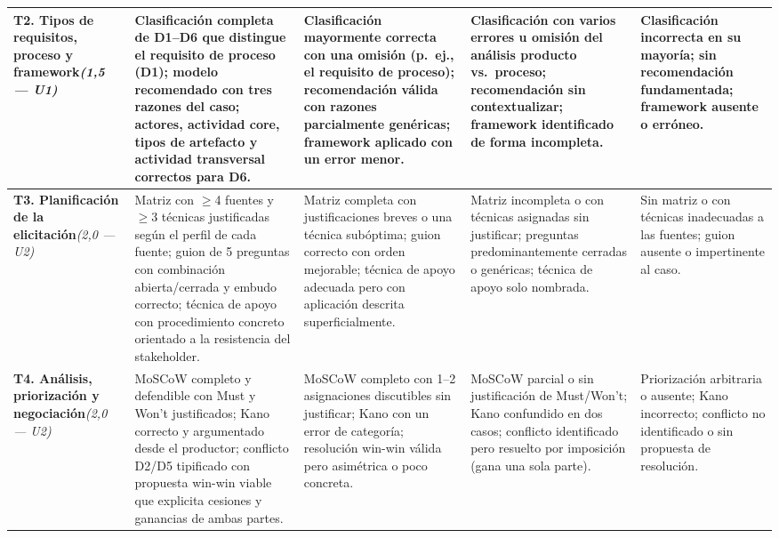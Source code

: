\documentclass[11pt]{article}
\begin{document}
\begin{landscape}
{\begin{longtable}{|L{3.2cm}|L{5.6cm}|L{5.3cm}|L{4.9cm}|L{4.3cm}|}
\textbf{T2. Tipos de requisitos, proceso y framework}\newline\textit{(1{,}5 — U1)} &
Clasificación completa de D1--D6 que distingue el requisito de \textbf{proceso} (D1); modelo recomendado con tres razones del caso; actores, actividad core, tipos de artefacto y actividad transversal correctos para D6. &
Clasificación mayormente correcta con una omisión (p.\ ej., el requisito de proceso); recomendación válida con razones parcialmente genéricas; framework aplicado con un error menor. &
Clasificación con varios errores u omisión del análisis producto vs.\ proceso; recomendación sin contextualizar; framework identificado de forma incompleta. &
Clasificación incorrecta en su mayoría; sin recomendación fundamentada; framework ausente o erróneo. \\
\hline

\textbf{T3. Planificación de la elicitación}\newline\textit{(2{,}0 — U2)} &
Matriz con $\geq$4 fuentes y $\geq$3 técnicas justificadas según el perfil de cada fuente; guion de 5 preguntas con combinación abierta/cerrada y embudo correcto; técnica de apoyo con procedimiento concreto orientado a la resistencia del stakeholder. &
Matriz completa con justificaciones breves o una técnica subóptima; guion correcto con orden mejorable; técnica de apoyo adecuada pero con aplicación descrita superficialmente. &
Matriz incompleta o con técnicas asignadas sin justificar; preguntas predominantemente cerradas o genéricas; técnica de apoyo solo nombrada. &
Sin matriz o con técnicas inadecuadas a las fuentes; guion ausente o impertinente al caso. \\
\hline

\textbf{T4. Análisis, priorización y negociación}\newline\textit{(2{,}0 — U2)} &
MoSCoW completo y defendible con Must y Won't justificados; Kano correcto y argumentado desde el productor; conflicto D2/D5 tipificado con propuesta win-win viable que explicita cesiones y ganancias de ambas partes. &
MoSCoW completo con 1--2 asignaciones discutibles sin justificar; Kano con un error de categoría; resolución win-win válida pero asimétrica o poco concreta. &
MoSCoW parcial o sin justificación de Must/Won't; Kano confundido en dos casos; conflicto identificado pero resuelto por imposición (gana una sola parte). &
Priorización arbitraria o ausente; Kano incorrecto; conflicto no identificado o sin propuesta de resolución. \\
\hline


\end{longtable}}
\end{landscape}
\end{document}
